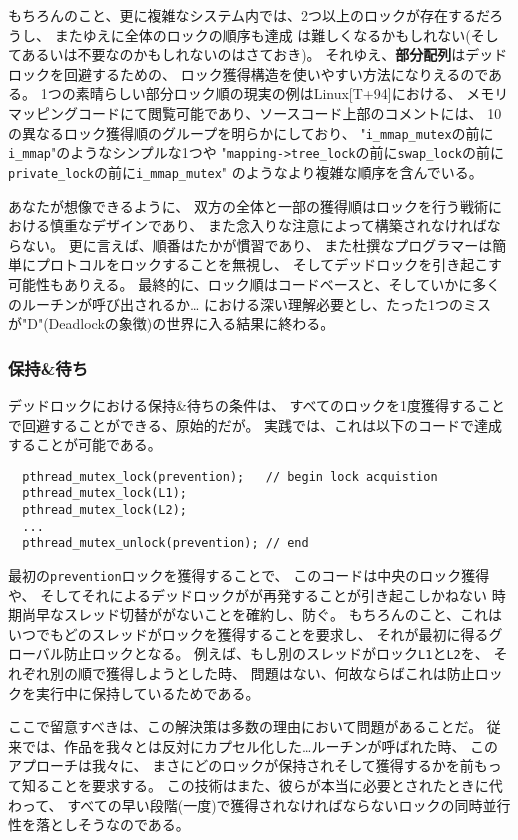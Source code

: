 \documentclass[11pt,a4paper, uplatex]{jsarticle}
\begin{document}
もちろんのこと、更に複雑なシステム内では、2つ以上のロックが存在するだろうし、
またゆえに全体のロックの順序も達成
は難しくなるかもしれない(そしてあるいは不要なのかもしれないのはさておき)。
それゆえ、\textbf{部分配列}はデッドロックを回避するための、
ロック獲得構造を使いやすい方法になりえるのである。
1つの素晴らしい部分ロック順の現実の例はLinux[T+94]における、
メモリマッピングコードにて閲覧可能であり、ソースコード上部のコメントには、
10の異なるロック獲得順のグループを明らかにしており、
"\texttt{i_mmap_mutex}の前に\texttt{i_mmap}"のようなシンプルな1つや
"\texttt{mapping-\textgreater tree_lock}の前に\texttt{swap_lock}の前に
\texttt{private_lock}の前に\texttt{i_mmap_mutex}"
のようなより複雑な順序を含んでいる。

あなたが想像できるように、
双方の全体と一部の獲得順はロックを行う戦術における慎重なデザインであり、
また念入りな注意によって構築されなければならない。
更に言えば、順番はたかが慣習であり、
また杜撰なプログラマーは簡単にプロトコルをロックすることを無視し、
そしてデッドロックを引き起こす可能性もありえる。
最終的に、ロック順はコードベースと、そしていかに多くのルーチンが呼び出されるか…
における深い理解必要とし、たった1つのミスが"D"(Deadlockの象徴)の世界に入る結果に終わる。

\subsubsection{保持\&待ち}
デッドロックにおける保持\&待ちの条件は、
すべてのロックを1度獲得することで回避することができる、原始的だが。
実践では、これは以下のコードで達成することが可能である。
\begin{lstlisting}
  pthread_mutex_lock(prevention);   // begin lock acquistion
  pthread_mutex_lock(L1);
  pthread_mutex_lock(L2);
  ...
  pthread_mutex_unlock(prevention); // end
\end{lstlisting}

最初の\texttt{prevention}ロックを獲得することで、
このコードは中央のロック獲得や、
そしてそれによるデッドロックがが再発することが引き起こしかねない
時期尚早なスレッド切替ががないことを確約し、防ぐ。
もちろんのこと、これはいつでもどのスレッドがロックを獲得することを要求し、
それが最初に得るグローバル防止ロックとなる。
例えば、もし別のスレッドがロック\texttt{L1}と\texttt{L2}を、
それぞれ別の順で獲得しようとした時、
問題はない、何故ならばこれは防止ロックを実行中に保持しているためである。

ここで留意すべきは、この解決策は多数の理由において問題があることだ。
従来では、作品を我々とは反対にカプセル化した…ルーチンが呼ばれた時、
このアプローチは我々に、
まさにどのロックが保持されそして獲得するかを前もって知ることを要求する。
この技術はまた、彼らが本当に必要とされたときに代わって、
すべての早い段階(一度)で獲得されなければならないロックの同時並行性を落としそうなのである。
\end{document}
